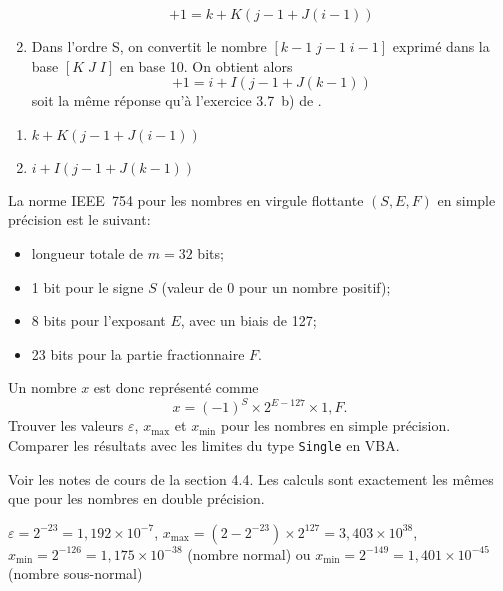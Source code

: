 \begin{exercice}
\begin{sol}
\begin{enumerate}
\begin{displaymath}
        [((i - 1) \times J + j - 1) \times K + k - 1] + 1
        = k + K (j - 1 + J (i - 1))
      \end{displaymath}
    \item Dans l'ordre S, on convertit le nombre $[k - 1\; j - 1\; i -
      1]$ exprimé dans la base $[K\; J\; I]$ en base 10. On obtient alors
      \begin{displaymath}
        [((k - 1) \times J + j - 1) \times I + i - 1] + 1
        = i + I (j - 1 + J (k - 1))
      \end{displaymath}
      soit la même réponse qu'à l'exercice 3.7~b) de
      \cite{Goulet_intro_S}.
    \end{enumerate}
  \end{sol}
  \begin{rep}
    \begin{enumerate}
    \item $k + K (j - 1 + J (i - 1))$
    \item $i + I (j - 1 + J (k - 1))$
    \end{enumerate}
  \end{rep}
\end{exercice}

\begin{exercice}
  La norme IEEE~754 pour les nombres en virgule flottante $(S,
  E, F)$ en simple précision est le suivant:
  \begin{itemize}
  \item longueur totale de $m = 32$ bits;
  \item 1 bit pour le signe $S$ (valeur de 0 pour un nombre positif);
  \item 8 bits pour l'exposant $E$, avec un biais de 127;
  \item 23 bits pour la partie fractionnaire $F$.
  \end{itemize}
  Un nombre $x$ est donc représenté comme
  \begin{displaymath}
    x = (-1)^S \times 2^{E - 127} \times 1,F.
  \end{displaymath}
  Trouver les valeurs $\varepsilon$, $x_{\max}$ et $x_{\min}$ pour les
  nombres en simple précision. Comparer les résultats avec les limites
  du type \texttt{Single} en VBA.
  \begin{sol}
    Voir les notes de cours de la section 4.4. Les calculs sont
    exactement les mêmes que pour les nombres en double précision.
  \end{sol}
  \begin{rep}
    $\varepsilon = 2^{-23} = 1,192 \times 10^{-7}$,
    $x_{\max} = (2 - 2^{-23}) \times 2^{127} = 3,403 \times 10^{38}$,
    $x_{\min} = 2^{-126} = 1,175 \times 10^{-38}$ (nombre normal) ou
    $x_{\min} = 2^{-149} = 1,401 \times 10^{-45}$ (nombre sous-normal)
  \end{rep}
\end{exercice}


